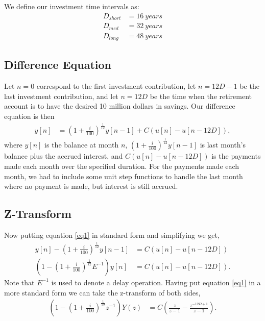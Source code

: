 \documentclass[letterpaper]{article}
\begin{document}
We define our investment time intervals as:
\begin{align*}
	D_{short} &= \SI{16}{years}  \\
	D_{med}   &= \SI{32}{years}  \\
	D_{long}  &= \SI{48}{years}
\end{align*}

\pagebreak
\subsection{Difference Equation}
Let $n=0$ correspond to the first investment contribution, let $n = 12D -1$ be the last investment contribution, and let $n = 12D$ be the time when the retirement account is to have the desired 10 million dollars in savings. Our difference equation is then
\begin{align}
	y[n] &= \left(1 + \frac{i}{100} \right)^{\frac{1}{12}} y[n-1] + C (u[n] - u[n-12D]), \label{eq1}
\end{align}
where $y[n]$ is the balance at month $n$, $\left(1 + \frac{i}{100} \right)^{\frac{1}{12}} y[n-1]$ is last month's balance plus the accrued interest, and $C(u[n] - u[n-12D])$ is the payments made each month over the specified duration. For the payments made each month, we had to include some unit step functions to handle the last month where no payment is made, but interest is still accrued.

\subsection{Z-Transform}

Now putting equation \ref{eq1} in standard form and simplifying we get,
\begin{align}
	y[n] - \left(1 + \frac{i}{100} \right)^{\frac{1}{12}} y[n-1] &= C (u[n] - u[n-12D]) \\
	\left(1 - \left(1 + \frac{i}{100} \right)^{\frac{1}{12}}E^{-1}\right)y[n] &= C (u[n] - u[n-12D]). \label{eq2}
\end{align}
Note that $E^{-1}$ is used to denote a delay operation. Having put equation \ref{eq1} in a more standard form we can take the z-transform of both sides,
\begin{align}
	\left(1 - \left(1 + \frac{i}{100} \right)^{\frac{1}{12}}z^{-1}\right)Y(z) &= C \left(\frac{z}{z-1} - \frac{z^{-12D+1}}{z-1} \right).
\end{align}
\end{document}
